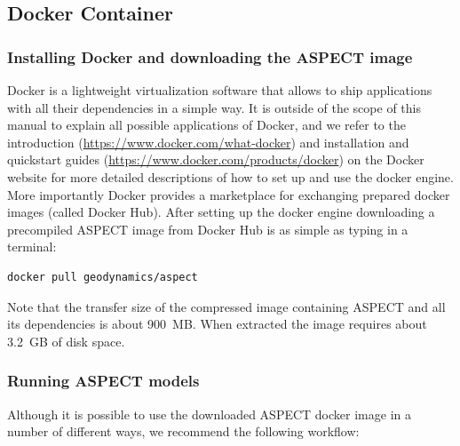 \documentclass{article}
\newcommand{\aspect}{\textsc{ASPECT}}
\begin{document}
\subsection{Docker Container}
\label{subsec:docker_container}

\subsubsection{Installing Docker and downloading the \aspect{} image}

Docker is a lightweight virtualization software that allows to ship
applications with all their dependencies in a simple way. It is outside of the
scope of this manual to explain all possible applications of Docker, and we
refer to the introduction (\url{https://www.docker.com/what-docker}) and
installation and quickstart guides
(\url{https://www.docker.com/products/docker}) on the Docker website for more
detailed descriptions of how to set up and use the docker engine. More
importantly Docker provides a marketplace for exchanging prepared docker images
(called Docker Hub). After setting up the docker engine downloading a
precompiled \aspect{} image from Docker Hub is as simple as typing in a
terminal:

\begin{lstlisting}[frame=single,language=ksh]
docker pull geodynamics/aspect
\end{lstlisting}

Note that the transfer size of the compressed image containing \aspect{} and
all its dependencies is about 900~MB. When extracted the image requires about
3.2~GB of disk space.

\subsubsection{Running \aspect{} models}
Although it is possible to use the downloaded \aspect{} docker image in a
number of different ways, we recommend the following workflow:
\end{document}
